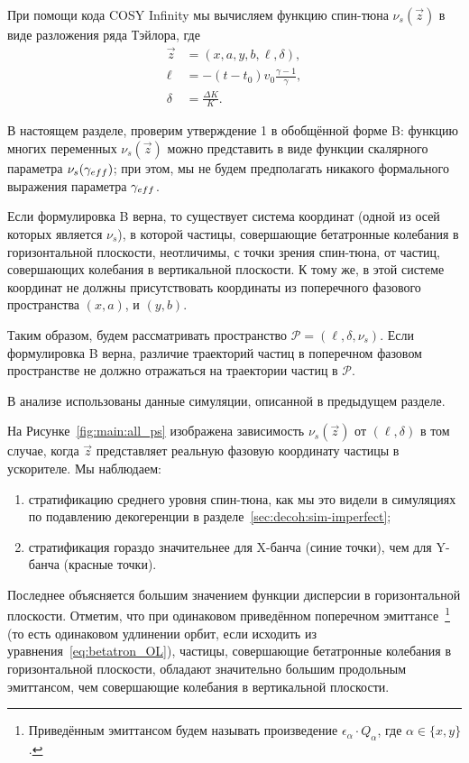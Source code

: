 \newcommand{\Ps}{\mathcal P}

При помощи кода COSY Infinity мы вычисляем функцию спин-тюна $\nu_s(\vec z)$ в виде
разложения ряда Тэйлора, где
\begin{align*}
  \vec z &= (x,a,y,b,\ell,\delta), \\
  \ell &= -(t - t_0)v_0\frac{\gamma-1}{\gamma}, \\
  \delta &= \frac{\Delta K}{K}.
\end{align*}

В настоящем разделе, проверим утверждение 1 в обобщённой форме B: функцию многих переменных $\nu_s(\vec z)$
можно представить в виде функции скалярного параметра $\nu_s(\g*)$; при этом, мы не будем предполагать
никакого формального выражения параметра $\g*$.

Если формулировка B верна, то существует система координат (одной из осей которых является $\nu_s$),
в которой частицы, совершающие бетатронные колебания в горизонтальной плоскости, неотличимы,
с точки зрения спин-тюна, от частиц, совершающих колебания в вертикальной плоскости. К тому же, в этой системе координат не должны присутствовать координаты из поперечного
фазового пространства $(x,a)$, и $(y,b)$.

Таким образом, будем рассматривать пространство $\Ps=(\ell, \delta, \nu_s)$. Если формулировка B верна,
различие траекторий частиц в поперечном фазовом пространстве не должно отражаться на траектории частиц в $\Ps$.

В анализе использованы данные симуляции, описанной в предыдущем разделе.

На Рисунке~\ref{fig:main:all_ps} изображена зависимость $\nu_s(\vec z)$ от $(\ell, \delta)$ в том случае, когда
$\vec z$ представляет реальную фазовую координату частицы в ускорителе. Мы наблюдаем:
\begin{enumerate}
\item стратификацию среднего уровня спин-тюна, как мы это видели в симуляциях по подавлению декогеренции
  в разделе~\ref{sec:decoh:sim-imperfect};
  \item стратификация гораздо значительнее для X-банча (синие точки), чем для Y-банча (красные точки).
\end{enumerate}

Последнее объясняется большим значением функции дисперсии в горизонтальной плоскости. Отметим, что при одинаковом приведённом поперечном эмиттансе~\footnote{Приведённым эмиттансом будем называть произведение $\epsilon_\alpha\cdot Q_\alpha$, где $\alpha\in\{x,y\}$.} (то есть одинаковом удлинении орбит, если исходить из уравнения~\eqref{eq:betatron_OL}), частицы, совершающие бетатронные колебания в горизонтальной плоскости, обладают значительно большим продольным эмиттансом, чем совершающие колебания в вертикальной плоскости.

